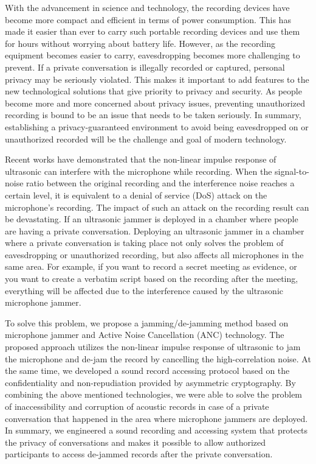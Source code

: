 \begin{abstract*}

    With the advancement in science and technology,
the recording devices have become more compact and efficient in terms of power consumption.
This has made it easier than ever to carry such portable recording devices
and use them for hours without worrying about battery life.
However, as the recording equipment becomes easier to carry,
eavesdropping becomes more challenging to prevent.
If a private conversation is illegally recorded or captured,
personal privacy may be seriously violated.
This makes it important to add features to the new technological solutions
that give priority to privacy and security.
As people become more and more concerned about privacy issues,
preventing unauthorized recording is bound to be an issue that needs to be taken seriously.
In summary, establishing a privacy-guaranteed environment
to avoid being eavesdropped on or unauthorized recorded
will be the challenge and goal of modern technology.

    Recent works have demonstrated that the non-linear impulse response of ultrasonic
can interfere with the microphone while recording.
When the signal-to-noise ratio between the original recording
and the interference noise reaches a certain level,
it is equivalent to a denial of service (DoS) attack on the microphone's recording.
The impact of such an attack on the recording result can be devastating.
If an ultrasonic jammer is deployed in a chamber where people are having a private conversation.
Deploying an ultrasonic jammer in a chamber where a private conversation is taking place
not only solves the problem of eavesdropping or unauthorized recording,
but also affects all microphones in the same area.
For example, if you want to record a secret meeting as evidence,
or you want to create a verbatim script based on the recording after the meeting,
everything will be affected due to the interference caused by the ultrasonic microphone jammer.

    To solve this problem, we propose a jamming/de-jamming method
based on microphone jammer and Active Noise Cancellation (ANC) technology.
The proposed approach utilizes the non-linear impulse response of ultrasonic to jam the microphone
and de-jam the record by cancelling the high-correlation noise.
At the same time, we developed a sound record accessing protocol
based on the confidentiality and non-repudiation provided by asymmetric cryptography.
By combining the above mentioned technologies,
we were able to solve the problem of inaccessibility and corruption of acoustic records
in case of a private conversation that happened in the area where microphone jammers are deployed.
In summary, we engineered a sound recording and accessing system
that protects the privacy of conversations and makes it possible to allow authorized participants
to access de-jammed records after the private conversation.

\end{abstract*}